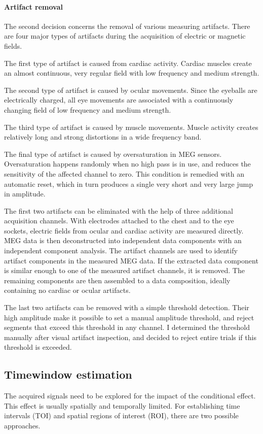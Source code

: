 \paragraph{Artifact removal}
The second decision concerns the removal of various measuring artifacts.
There are four major types of artifacts during the acquisition of electric or magnetic fields.

The first type of artifact is caused from cardiac activity.
Cardiac muscles create an almost continuous, very regular field with low frequency and medium strength.

The second type of artifact is caused by ocular movements.
Since the eyeballs are electrically charged, all eye movements are associated with a continuously changing field of low frequency and medium strength.

The third type of artifact is caused by muscle movements.
Muscle activity creates relatively long and strong distortions in a wide frequency band.

The final type of artifact is caused by oversaturation in MEG sensors.
Oversaturation happens randomly when no high pass is in use, and reduces the sensitivity of the affected channel to zero.
This condition is remedied with an automatic reset, which in turn produces a single very short and very large jump in amplitude.

The first two artifacts can be eliminated with the help of three additional acquisition channels.
With electrodes attached to the chest and to the eye sockets, electric fields from ocular and cardiac activity are measured directly.
MEG data is then deconstructed into independent data components with an independent component analysis.
The artifact channels are used to identify artifact components in the measured MEG data.
If the extracted data component is similar enough to one of the measured artifact channels, it is removed. 
The remaining components are then assembled to a data composition, ideally containing no cardiac or ocular artifacts.

The last two artifacts can be removed with a simple threshold detection.
Their high amplitude make it possible to set a manual amplitude threshold, and reject segments that exceed this threshold in any channel.
I determined the threshold manually after visual artifact inspection, and decided to reject entire trials if this threshold is exceeded.

\subsection{Timewindow estimation}
The acquired signals need to be explored for the impact of the conditional effect.
This effect is usually spatially and temporally limited.
For establishing time intervals (TOI) and spatial regions of interest (ROI), there are two possible approaches.

